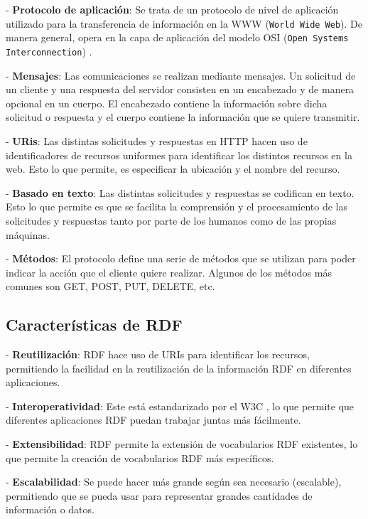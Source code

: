 \documentclass[11pt]{report}
\begin{document}
\indent \indent \indent - \textbf{Protocolo de aplicación}: Se trata de un protocolo de nivel de aplicación utilizado para la transferencia de información en la WWW (\texttt{World Wide Web}). De manera general, opera en la capa de aplicación del modelo OSI (\texttt{Open Systems Interconnection}) \cite{1}.

\indent \indent \indent - \textbf{Mensajes}: Las comunicaciones se realizan mediante mensajes. Un solicitud de un cliente y una respuesta del servidor consisten en un encabezado y de manera opcional en un cuerpo. El encabezado contiene la información sobre dicha solicitud o respuesta y el cuerpo contiene la información que se quiere transmitir.

\indent \indent \indent - \textbf{URis}: Las distintas solicitudes y respuestas en HTTP hacen uso de identificadores de recursos uniformes para identificar los distintos recursos en la web. Esto lo que permite, es especificar la ubicación y el nombre del recurso.

\indent \indent \indent - \textbf{Basado en texto}: Las distintas solicitudes y respuestas se codifican en texto.  Esto lo que permite es que se facilita la comprensión y el procesamiento de las solicitudes y respuestas tanto por parte de los humanos como de las propias máquinas.

\indent \indent \indent - \textbf{Métodos}: El protocolo define una serie de métodos que se utilizan para poder indicar la acción que el cliente quiere realizar. Algunos de los métodos más comunes son GET, POST, PUT, DELETE, etc.

\subsection{Características de RDF} \label{subsec:Características-RDF}

\indent \indent \indent - \textbf{Reutilización}: RDF hace uso de URIs para identificar los recursos, permitiendo la facilidad en la reutilización de la información RDF en diferentes aplicaciones.

\indent \indent \indent - \textbf{Interoperatividad}: Este está estandarizado por el W3C \cite{5}, lo que permite que diferentes aplicaciones RDF puedan trabajar juntas más fácilmente.

\indent \indent \indent - \textbf{Extensibilidad}: RDF permite la extensión de vocabularios RDF existentes, lo que permite la creación de vocabularios RDF más específicos.

\indent \indent \indent - \textbf{Escalabilidad}: Se puede hacer más grande según sea necesario (escalable),  permitiendo que se pueda usar para representar grandes cantidades de información o datos.
\end{document}
